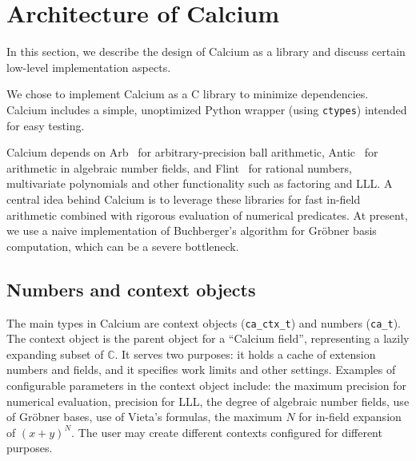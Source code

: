 \documentclass[sigconf,screen,urlbreakonhyphens]{acmart}
\begin{document}
\section{Architecture of Calcium}

\label{sect:calcium}

In this section, we describe the design of Calcium
as a library and discuss certain low-level implementation
aspects.

We chose to implement Calcium as a C library
to minimize dependencies.
Calcium includes a simple, unoptimized Python wrapper (using \texttt{ctypes})
intended for easy testing.

Calcium depends on
Arb~\cite{Joh2017} for arbitrary-precision ball arithmetic,
Antic~\cite{Har2015} for arithmetic in algebraic number fields,
and Flint~\cite{Har2010} for rational numbers,
multivariate polynomials and other functionality such as factoring and LLL.
A central idea behind Calcium is to leverage
these libraries for fast in-field arithmetic combined with rigorous evaluation of numerical predicates.
At present, we use a naive implementation of Buchberger's algorithm for
Gr\"{o}bner basis computation, which can be a severe bottleneck.

\subsection{Numbers and context objects}

The main types in Calcium are context objects (\texttt{ca\_ctx\_t})
and numbers (\texttt{ca\_t}). The context object
is the parent object for a 
``Calcium field'', representing a lazily expanding subset of $\mathbb{C}$.
It serves two purposes: it holds a cache of extension numbers
and fields, and it specifies work limits and other settings.
Examples of configurable parameters in the context object include:
the maximum precision for numerical evaluation,
precision for LLL,
the degree of algebraic number fields,
use of Gr\"{o}bner bases, use of Vieta's formulas,
the maximum $N$ for in-field expansion of $(x+y)^N$.
The user may create different contexts configured for different purposes.
\end{document}
